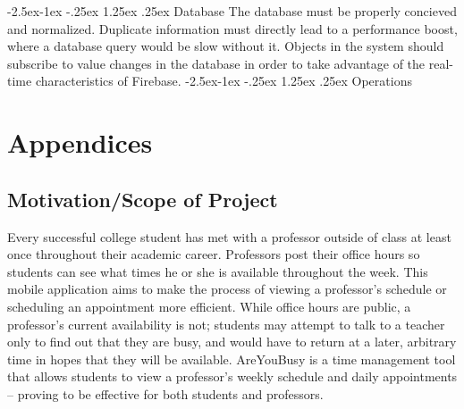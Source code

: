 \documentclass{article}
\makeatletter
\renewcommand\paragraph{\@startsection{paragraph}{4}{\z@}%
            {-2.5ex\@plus -1ex \@minus -.25ex}%
            {1.25ex \@plus .25ex}%
            {\normalfont\normalsize\bfseries}}
\makeatother
\begin{document}
  \paragraph{Database}
  The database must be properly concieved and normalized. Duplicate information must directly lead to a 
  performance boost, where a database query would be slow without it. Objects in the system should subscribe
  to value changes in the database in order to take advantage of the real-time characteristics of Firebase.
  \paragraph{Operations}

  \section{Appendices}
  \subsection{Motivation/Scope of Project}
  Every successful college student has met with a professor outside of class at least once throughout their 
  academic career. Professors post their office hours so students can see what times he or she is available 
  throughout the week. This mobile application aims to make the process of viewing a professor’s schedule or 
  scheduling an appointment more efficient. While office hours are public, a professor’s current availability 
  is not; students may attempt to talk to a teacher only to find out that they are busy, and would have to 
  return at a later, arbitrary time in hopes that they will be available.  AreYouBusy is a time management 
  tool that allows students to view a professor’s weekly schedule and daily appointments -- proving to be 
  effective for both students and professors.
\end{document}

